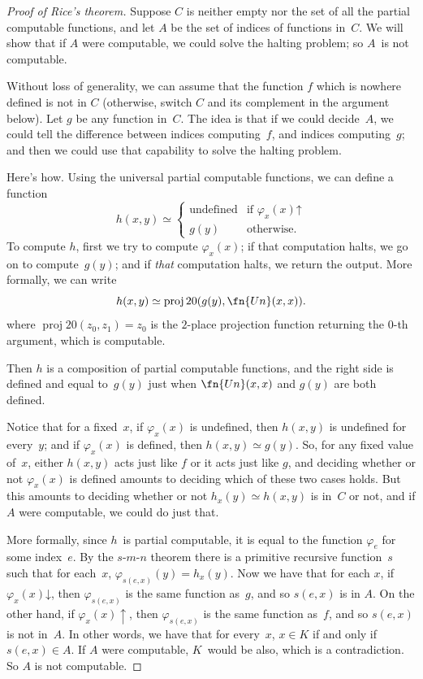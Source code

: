 \documentclass[10pt,a4paper]{article}
\theoremstyle{plain}
\theoremstyle{definition}
\theoremstyle{remark}
\providecommand{\cfind}[1]{\varphi_{#1}}
\providecommand{\fdefined}{\mathord{\downarrow}}
\providecommand{\Proj}{\operatorname{proj}}
\providecommand{\fundefined}{\mathord{\uparrow}}
\begin{document}
\begin{proof}[Proof of Rice's theorem]
Suppose $C$ is neither empty nor the set of all the partial
computable functions, and let $A$ be the set of indices of functions
in~$C$. We will show that if $A$ were computable, we could solve the
halting problem; so $A$~is not computable.

Without loss of generality, we can assume that the function $f$ which
is nowhere defined is not in $C$ (otherwise, switch $C$ and its
complement in the argument below). Let $g$ be any function in~$C$. The
idea is that if we could decide~$A$, we could tell the difference
between indices computing~$f$, and indices computing~$g$; and then we
could use that capability to solve the halting problem.

Here's how. Using the universal partial computable functions, we can
define a function
\[
h(x,y) \simeq
\begin{cases}
\text{undefined} & \text{if $\cfind{x}(x) \fundefined$} \\
g(y) & \text{otherwise.}
\end{cases}
\]
To compute $h$, first we try to compute $\cfind{x}(x)$; if that
computation halts, we go on to compute~$g(y)$; and if {\em that}
computation halts, we return the output. More formally, we can write
\[
h(x,y) \simeq \Proj{2}{0}(g(y),\fn{Un}(x,x)).
\]
where $\Proj{2}{0}(z_0, z_1) = z_0$ is the $2$-place projection
function returning the $0$-th argument, which is computable.

Then $h$ is a composition of partial computable functions, and the right
side is defined and equal to~$g(y)$ just when $\fn{Un}(x,x)$ and
$g(y)$ are both defined.

Notice that for a fixed~$x$, if $\cfind{x}(x)$ is undefined, then
$h(x,y)$ is undefined for every~$y$; and if $\cfind{x}(x)$ is defined,
then $h(x,y) \simeq g(y)$. So, for any fixed value of~$x$, either
$h(x,y)$ acts just like $f$ or it acts just like $g$, and deciding
whether or not $\cfind{x}(x)$ is defined amounts to deciding which of
these two cases holds. But this amounts to deciding whether or not
$h_x(y) \simeq h(x,y)$ is in~$C$ or not, and if $A$ were computable,
we could do just that.

More formally, since $h$~is partial computable, it is equal to the
function $\cfind{e}$ for some index~$e$. By the $s$-$m$-$n$ theorem
there is a primitive recursive function~$s$ such that for each~$x$,
$\cfind{s(e,x)}(y) = h_x(y)$. Now we have that for each $x$, if
$\cfind{x}(x) \fdefined$, then $\cfind{s(e,x)}$ is the same function
as~$g$, and so $s(e,x)$ is in $A$. On the other hand, if $\cfind{x}(x)
\uparrow$, then $\cfind{s(e,x)}$ is the same function as~$f$, and so
$s(e,x)$ is not in~$A$. In other words, we have that for every~$x$, $x
\in K$ if and only if $s(e,x) \in A$. If $A$ were computable,
$K$~would be also, which is a contradiction. So $A$ is not computable.
\end{proof}
\end{document}
